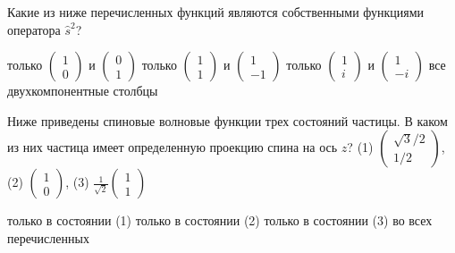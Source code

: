 \documentclass[11pt,a4paper]{exam}
\begin{document}
\begin{questions}
\question Какие из ниже перечисленных функций являются собственными функциями оператора ${\hat s^2}$?
\begin{choices}
\choice только $\left( {\begin{array}{*{20}{c}}
1\\
0
\end{array}} \right)$ и $\left( {\begin{array}{*{20}{c}}
0\\
1
\end{array}} \right)$         
\choice только $\left( {\begin{array}{*{20}{c}}
1\\
1
\end{array}} \right)$ и $\left( {\begin{array}{*{20}{c}}
1\\
{ - 1}
\end{array}} \right)$
\choice только $\left( {\begin{array}{*{20}{c}}
1\\
i
\end{array}} \right)$ и $\left( {\begin{array}{*{20}{c}}
1\\
{ - i}
\end{array}} \right)$      
\choice все двухкомпонентные столбцы
\end{choices}

\question Ниже приведены спиновые волновые функции трех состояний частицы. В каком из них частица имеет определенную проекцию спина на ось $z$?
(1) $\left( {\begin{array}{*{20}{c}}
{\sqrt 3 /2}\\
{1/2}
\end{array}} \right)$,  (2) $\left( {\begin{array}{*{20}{c}}
1\\
0
\end{array}} \right)$, (3) $\frac{1}{{\sqrt 2 }}\left( {\begin{array}{*{20}{c}}
1\\
1
\end{array}} \right)$
\begin{choices}
\choice только в состоянии (1)        
\choice только в состоянии (2)
\choice только в состоянии (3)        
\choice во всех перечисленных
\end{choices}


\end{questions}
\end{document}
